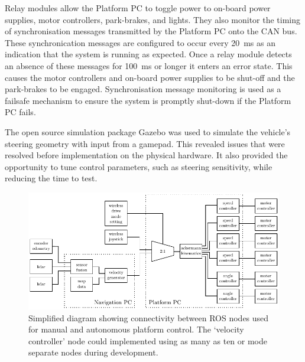 \documentclass[preprint,authoryear,12pt]{elsarticle}
\begin{document}
        Relay modules allow the Platform PC to toggle power to on-board power supplies, motor controllers, park-brakes, and lights.
        They also monitor the timing of synchronisation messages transmitted by the Platform PC onto the CAN bus.
        These synchronication messages are configured to occur every \SI{20}{\milli\second} as an indication that the system is running as expected.
        Once a relay module detects an absence of these messages for \SI{100}{\milli\second} or longer it enters an error state.
        This causes the motor controllers and on-board power supplies to be shut-off and the park-brakes to be engaged.
        Synchronisation message monitoring is used as a failsafe mechanism to ensure the system is promptly shut-down if the Platform PC fails.

        The open source simulation package Gazebo was used to simulate the vehicle's steering geometry with input from a gamepad.
        This revealed issues that were resolved before implementation on the physical hardware.
        It also provided the opportunity to tune control parameters, such as steering sensitivity, while reducing the time to test.

        \begin{figure}[htb]
            \centering
            \includegraphics[width=\linewidth]{imgs/system_diagram/software_v2.pdf}
            \caption{Simplified diagram showing connectivity between ROS nodes used for manual and autonomous platform control.
            The `velocity controller' node could implemented using as many as ten or mode separate nodes during development.}
            \label{fig:system_diagram_software}
        \end{figure}

\end{document}

